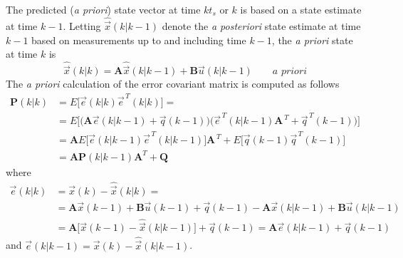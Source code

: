 \documentclass[11pt,a4paper,oneside]{book}
\numberwithin{equation}{section}
\theoremstyle{it}
\theoremstyle{definition}
\begin{document}
The predicted (\textit{a priori}) state vector at time $kt_s$ or $k$ is based 
on a state estimate at time $k-1$. Letting $\hat{\vec{x}}\left(k|k-1\right)$ 
denote the \textit{a posteriori} state estimate at time $k-1$ based on 
measurements up to and including time $k-1$, the \textit{a priori} state at 
time $k$ is
\begin{equation}\label{kalman_1}
	\hat{\vec{x}}\left(k|k\right) = \mathbf{A} \hat{\vec{x}}\left(k|k-1\right) 
	+ \mathbf{B} \vec{u}\left(k|k-1\right) \qquad \textit{a priori}
\end{equation}
The \textit{a priori} calculation of the error covariant matrix is computed as 
follows
\begin{equation}\label{kalman_2}
	\begin{aligned}
		\mathbf{P}\left(k|k\right) &= E\Big[\vec{e}(k|k)\vec{e}^{\,T}(k|k)\Big] 
		= \\[6pt]
		&= E\Big[\Big(\mathbf{A}\vec{e}(k|k-1) + 
		\vec{q}(k-1)\Big)\Big(\vec{e}^{\,T}(k|k-1) \mathbf{A}^{\,T} + 
		\vec{q}^{\,T}(k-1)\Big)\Big] \\[6pt]
		&= \mathbf{A}E\Big[\vec{e}(k|k-1) 
		\vec{e}^{\,T}(k|k-1)\Big]\mathbf{A}^{\,T} + E\Big[\vec{q}(k-1) 
		\vec{q}^{\,T}(k-1)\Big] \\[6pt]
		&= \mathbf{A} \mathbf{P}\left(k|k-1\right) \mathbf{A}^T + \mathbf{Q}
	\end{aligned}
\end{equation}
where 
\begin{equation*}
	\begin{aligned}
		\vec{e}(k|k) &=\vec{x}(k) - \hat{\vec{x}}(k|k) = \\[6pt]
		&= \mathbf{A}\vec{x}(k-1)+\mathbf{B}\vec{u}(k-1)+\vec{q}(k-1) - 
		\mathbf{A}\vec{x}(k|k-1)+\mathbf{B}\vec{u}(k|k-1) \\[6pt]
		&= 
		\mathbf{A}\Big[\vec{x}(k-1)-\hat{\vec{x}}(k|k-1)\Big]+\vec{q}(k-1)=\mathbf{A}\vec{e}(k|k-1)+\vec{q}(k-1)
	\end{aligned}
\end{equation*}
and  $\vec{e}(k|k-1)=\vec{x}(k) - \hat{\vec{x}}(k|k-1)$. \\
\end{document}
